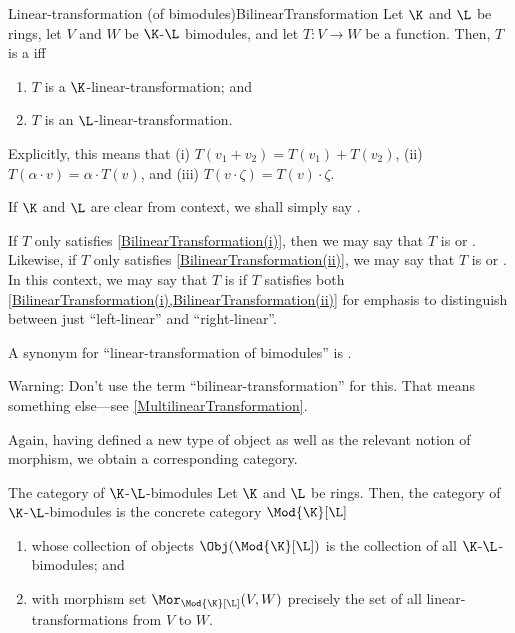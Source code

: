 \begin{dfn}{Linear-transformation (of bimodules)}{BilinearTransformation}
	Let $\K$ and $\L$ be rings, let $V$ and $W$ be $\K$-$\L$ bimodules, and let $T\colon V\rightarrow W$ be a function.  Then, $T$ is a  iff
	\begin{enumerate}
		\item \label{BilinearTransformation(i)}$T$ is a $\K$-linear-transformation; and
		\item \label{BilinearTransformation(ii)}$T$ is an $\L$-linear-transformation.
	\end{enumerate}
	\begin{rmk}
		Explicitly, this means that (i) $T(v_1+v_2)=T(v_1)+T(v_2)$, (ii) $T(\alpha \cdot v)=\alpha \cdot T(v)$, and (iii) $T(v\cdot \zeta )=T(v)\cdot \zeta$.
	\end{rmk}
	\begin{rmk}
		If $\K$ and $\L$ are clear from context, we shall simply say .
	\end{rmk}
	\begin{rmk}
		If $T$ only satisfies \cref{BilinearTransformation(i)}, then we may say that $T$ is  or .  Likewise, if $T$ only satisfies \cref{BilinearTransformation(ii)}, we may say that $T$ is  or .  In this context, we may say that $T$ is  if $T$ satisfies both \cref{BilinearTransformation(i),BilinearTransformation(ii)} for emphasis to distinguish between just ``left-linear'' and ``right-linear''.
	\end{rmk}
	\begin{rmk}
		A synonym for ``linear-transformation of bimodules'' is \index{Bimodule-homomorphism}.
	\end{rmk}
	\begin{rmk}
		Warning:  Don't use the term ``bilinear-transformation'' for this.  That means something else---see \cref{MultilinearTransformation}.
	\end{rmk}
\end{dfn}
Again, having defined a new type of object as well as the relevant notion of morphism, we obtain a corresponding category.
\begin{exm}{The category of $\K$-$\L$-bimodules}{}
	Let $\K$ and $\L$ be rings.  Then, the category of $\K$-$\L$-bimodules is the concrete category $\Mod{\K}[\L]$\index[notation]{$\Mod{\K}[\L]$}
	\begin{enumerate}
		\item whose collection of objects $\Obj (\Mod{\K}[\L])$ is the collection of all $\K$-$\L$-bimodules; and
		\item with morphism set $\Mor _{\Mod{\K}[\L]}(V,W)$ precisely the set of all linear-transformations from $V$ to $W$.
	\end{enumerate}
\end{exm}

